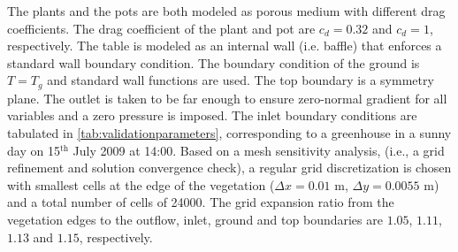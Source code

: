 The plants and the pots are both modeled as porous medium with different drag coefficients. The drag coefficient of the plant and pot are $c_d=0.32$ and $c_d=1$, respectively. The table is modeled as an internal wall (i.e. baffle) that enforces a standard wall boundary condition. The boundary condition of the ground is $T=T_g$ and standard wall functions are used. The top boundary is a symmetry plane. The outlet is taken to be far enough to ensure zero-normal gradient for all variables and a zero pressure is imposed. The inlet boundary conditions are tabulated in \cref{tab:validationparameters}, corresponding to a greenhouse in a sunny day on 15$^{\mathrm{th}}$ July 2009 at 14:00. Based on a mesh sensitivity analysis, (i.e., a grid refinement and solution convergence check), a regular grid discretization is chosen with smallest cells at the edge of the vegetation ($\Delta x=0.01$ m, $\Delta y=\num{0.0055}$ m) and a total number of cells of \num{24000}. The grid expansion ratio from the vegetation edges to the outflow, inlet, ground and top boundaries are $1.05$, $1.11$, $1.13$ and $1.15$, respectively. 


